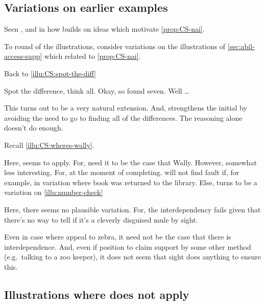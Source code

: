 \subsection{Variations on earlier examples}

\begin{note}
  Seen \nI{}, and in how builds on ideas which motivate \autoref{prop:CS-nai}.

  To round of the illustrations, consider variations on the illustrations of \ref{sec:abil-access-supp} which related to \autoref{prop:CS-nai}.
\end{note}

\begin{note}
  Back to \autoref{illu:CS:spot-the-diff}

  Spot the difference, think all.
  Okay, so found seven.
  Well \dots

  This turns out to be a very natural extension.
  And, strengthens the initial by avoiding the need to go to finding all of the differences.
  The reasoning alone doesn't do enough.
\end{note}

\begin{note}[Wally]
  Recall \autoref{illu:CS:wheres-wally}.

  Here, seems to apply.
  For, need it to be the case that Wally.
  However, somewhat less interesting.
  For, at the moment of completing.
  \nI{} will not find fault if, for example, in variation where book was returned to the library.
  Else, turns to be a variation on \autoref{illu:number-check}
\end{note}

\begin{note}
  Here, there seems no plausible variation.
  For, the interdependency fails given that there's no way to tell if it's a cleverly disguised mule by sight.

  Even in case where appeal to zebra, it need not be the case that there is interdependence.
  And, even if position to claim support by some other method (e.g.\ talking to a zoo keeper), it does not seem that sight does anything to ensure this.
\end{note}

\subsection{Illustrations where \nI{} does not apply}

